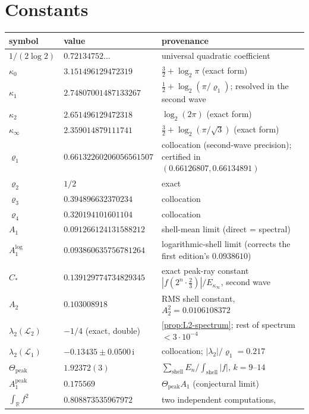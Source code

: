 \documentclass[11pt,oneside]{article}
\theoremstyle{definition}
\theoremstyle{remark}
\newcommand{\R}{\mathbb R}
\newcommand{\ii}{\mathrm i}
\newcommand{\Lop}{\mathcal L}
\begin{document}
\section{Constants}
\label{app:constants}

\begin{center}
\begin{tabular}{@{}lll@{}}
\toprule
symbol & value & provenance \\
\midrule
$1/(2\log2)$ & $0.72134752\ldots$ & universal quadratic coefficient\\
$\kappa_0$ & $3.151496129472319$ & $\tfrac32+\log_2\pi$ (exact form)\\
$\kappa_1$ & $2.74807001487133267$ & $\tfrac12+\log_2(\pi/\varrho_1)$;
resolved in the second wave\\
$\kappa_2$ & $2.651496129472318$ & $\log_2(2\pi)$ (exact form)\\
$\kappa_\infty$ & $2.359014879111741$ & $\tfrac32+\log_2(\pi/\sqrt3)$ (exact form)\\
$\varrho_1$ & $0.66132260206056561507$ & collocation (second-wave
precision); certified in $(0.66126807,0.66134891)$\\
$\varrho_2$ & $1/2$ & exact\\
$\varrho_3$ & $0.394896632370234$ & collocation\\
$\varrho_4$ & $0.320194101601104$ & collocation\\
$A_1$ & $0.091266124131588212$ & shell-mean limit (direct = spectral)\\
$A_1^{\log}$ & $0.093860635756781264$ & logarithmic-shell limit
(corrects the first edition's $0.0938610$)\\
$C_*$ & $0.139129774734829345$ & exact peak-ray constant
$|f(2^n\cdot\tfrac23)|/E_{\kappa_\infty}$, second wave\\
$A_2$ & $0.103008918$ & RMS shell constant, $A_2^2=0.0106108372$\\
$\lambda_2(\Lop_2)$ & $-1/4$ (exact, double) & \cref{prop:L2-spectrum};
rest of spectrum $<3\cdot10^{-4}$\\
$\lambda_2(\Lop_1)$ & $-0.13435\pm0.0500\,\ii$ & collocation;
$|\lambda_2|/\varrho_1=0.217$\\
$\Theta_{\mathrm{peak}}$ & $1.92372(3)$ &
$\sum_{\mathrm{shell}}E_n/\int_{\mathrm{shell}}|f|$, $k=9$--$14$\\
$A_1^{\mathrm{peak}}$ & $0.175569$ & $\Theta_{\mathrm{peak}}A_1$
(conjectural limit)\\
$\int_\R f^2$ & $0.808873535967972$ & two independent computations,

\end{tabular}
\end{center}
\end{document}
